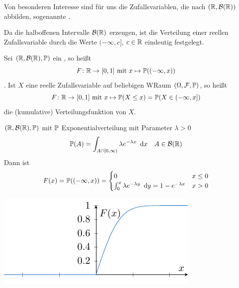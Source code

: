 Von besonderen Interesse sind für uns die Zufallsvariablen, die nach $(\R, \borel\R)$ abbilden, sogenannte .

Da die halboffenen Intervalle $\borel\R$ erzeugen, ist die Verteilung einer reellen Zufallsvariable durch die Werte $(-\infty, c]$, $c \in \R$ eindeutig festgelegt.

\begin{definition}[Verteilungsfunktion] \label{def: 1.16_verteilungsfunktion}
    Sei $(\R, \borel\R, \P)$ ein \WRaum, so heißt
    \begin{equation*}
        \abb{F}{\R}{[0,1]} \text{ mit } x \mapsto \P((-\infty, x))
    \end{equation*}
    .    
    Ist $X$ eine reelle Zufallsvariable auf beliebigen WRaum $(\Omega, \ereignisF, \P)$, so heißt
    \begin{equation*}
        \abb{F}{\R}{[0,1]} \text{ mit } x \mapsto \P(X \leq x) = \P(X \in (-\infty, x])
    \end{equation*} %
    die (kumulative) Verteilungsfunktion von $X$.
\end{definition}

\begin{beispiel}
    $(\R, \borel\R,\P)$ mit $\P$ Exponentialverteilung mit Parameter $\lambda > 0$
    \begin{equation*}
    \P(A) = \int_{A \cap [0,\infty)}\lambda e^{-\lambda x} \dx \quad A \in \borel\R
    \end{equation*}
    Dann ist
    \begin{equation*}
    F(x) = \P((-\infty, x)) = 
    \begin{cases}
        0 &x \le 0\\
        \int_{0}^{x} \lambda e^{-\lambda y} \dy = 1 - e^{-\lambda x} &x > 0
    \end{cases}\notag
    \end{equation*}
\end{beispiel}

\begin{center}
    \includegraphics{./stoch_abbildungen/exponentialverteilung_verteilungsfunktion.pdf}
\end{center}

